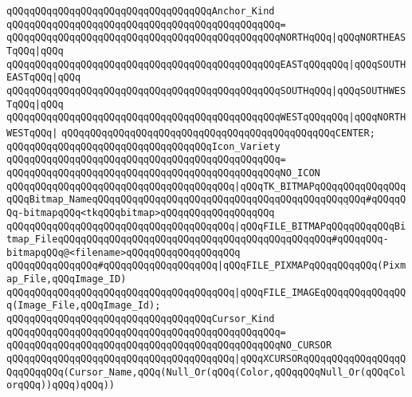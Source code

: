 \verb|qQQqqQQqqQQqqQQqqQQqqQQqqQQqqQQqqQQqAnchor_Kind|\newline
\verb|qQQqqQQqqQQqqQQqqQQqqQQqqQQqqQQqqQQqqQQqqQQqqQQq=|\newline
\verb|qQQqqQQqqQQqqQQqqQQqqQQqqQQqqQQqqQQqqQQqqQQqqQQqNORTHqQQq|\verb#|qQQqNORTHEASTqQQq|qQQq#\newline
\verb|qQQqqQQqqQQqqQQqqQQqqQQqqQQqqQQqqQQqqQQqqQQqqQQqEASTqQQqqQQq|\verb#|qQQqSOUTHEASTqQQq|qQQq#\newline
\verb|qQQqqQQqqQQqqQQqqQQqqQQqqQQqqQQqqQQqqQQqqQQqqQQqSOUTHqQQq|\verb#|qQQqSOUTHWESTqQQq|qQQq#\newline
\verb|qQQqqQQqqQQqqQQqqQQqqQQqqQQqqQQqqQQqqQQqqQQqqQQqWESTqQQqqQQq|\verb#|qQQqNORTHWESTqQQq|#\newline
\verb|qQQqqQQqqQQqqQQqqQQqqQQqqQQqqQQqqQQqqQQqqQQqqQQqCENTER;|\newline
\newline
\verb|qQQqqQQqqQQqqQQqqQQqqQQqqQQqqQQqqQQqIcon_Variety|\newline
\verb|qQQqqQQqqQQqqQQqqQQqqQQqqQQqqQQqqQQqqQQqqQQqqQQq=|\newline
\verb|qQQqqQQqqQQqqQQqqQQqqQQqqQQqqQQqqQQqqQQqqQQqqQQqNO_ICON|\newline
\verb|qQQqqQQqqQQqqQQqqQQqqQQqqQQqqQQqqQQqqQQq|\verb#|qQQqTK_BITMAPqQQqqQQqqQQqqQQqqQQqBitmap_NameqQQqqQQqqQQqqQQqqQQqqQQqqQQqqQQqqQQqqQQqqQQqqQQq#\verb|#qQQqqQQq-bitmapqQQq<tkqQQqbitmap>qQQqqQQqqQQqqQQqqQQq|\newline
\verb|qQQqqQQqqQQqqQQqqQQqqQQqqQQqqQQqqQQqqQQq|\verb#|qQQqFILE_BITMAPqQQqqQQqqQQqBitmap_FileqQQqqQQqqQQqqQQqqQQqqQQqqQQqqQQqqQQqqQQqqQQqqQQq#\verb|#qQQqqQQq-bitmapqQQq@<filename>qQQqqQQqqQQqqQQqqQQq|\newline
\verb|qQQqqQQqqQQqqQQq#qQQqqQQqqQQqqQQqqQQq|\verb#|qQQqFILE_PIXMAPqQQqqQQqqQQq(Pixmap_File,qQQqImage_ID)#\newline
\verb|qQQqqQQqqQQqqQQqqQQqqQQqqQQqqQQqqQQqqQQq|\verb#|qQQqFILE_IMAGEqQQqqQQqqQQqqQQq(Image_File,qQQqImage_Id);#\newline
\newline
\verb|qQQqqQQqqQQqqQQqqQQqqQQqqQQqqQQqqQQqCursor_Kind|\newline
\verb|qQQqqQQqqQQqqQQqqQQqqQQqqQQqqQQqqQQqqQQqqQQqqQQq=|\newline
\verb|qQQqqQQqqQQqqQQqqQQqqQQqqQQqqQQqqQQqqQQqqQQqqQQqNO_CURSOR|\newline
\verb|qQQqqQQqqQQqqQQqqQQqqQQqqQQqqQQqqQQqqQQq|\verb#|qQQqXCURSORqQQqqQQqqQQqqQQqqQQqqQQqqQQq(Cursor_Name,qQQq(Null_Or(qQQq(Color,qQQqqQQqNull_Or(qQQqColorqQQq))qQQq)qQQq))#\newline
